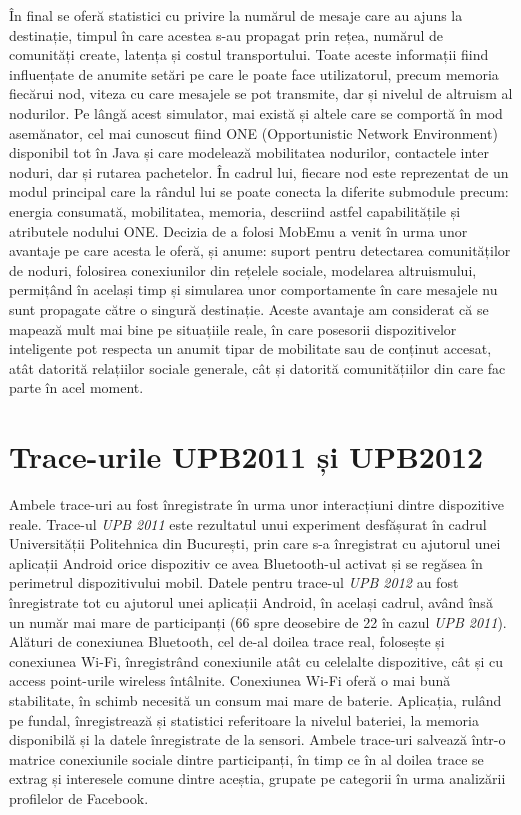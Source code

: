 \documentclass[12pt,a4paper]{report}
\begin{document}
În final se oferă statistici cu privire la numărul de mesaje care au ajuns la destinație, timpul în care acestea s-au propagat prin rețea, numărul de comunități create, latența și costul transportului. Toate aceste informații fiind influențate de anumite setări pe care le poate face utilizatorul, precum memoria fiecărui nod, viteza cu care mesajele se pot transmite, dar și nivelul de altruism al nodurilor.
Pe lângă acest simulator, mai există și altele care se comportă în mod asemănator, cel mai cunoscut fiind ONE (Opportunistic Network Environment)~\cite{OneArticle} disponibil tot în Java și care modelează mobilitatea nodurilor, contactele inter noduri, dar și rutarea pachetelor. În cadrul lui, fiecare nod este reprezentat de un modul principal care la rândul lui se poate conecta la diferite submodule precum: energia consumată, mobilitatea, memoria, descriind astfel capabilitățile și atributele nodului ONE. Decizia de a folosi MobEmu a venit în urma unor avantaje pe care acesta le oferă, și anume: suport pentru detectarea comunităților de noduri, folosirea conexiunilor din rețelele sociale, modelarea altruismului, permițând în același timp și simularea unor comportamente în care mesajele nu sunt propagate către o singură destinație. Aceste avantaje am considerat că se mapează mult mai bine pe situațiile reale, în care posesorii dispozitivelor inteligente pot respecta un anumit tipar de mobilitate sau de conținut accesat, atât datorită relațiilor sociale generale, cât și datorită comunitățiilor din care fac parte în acel moment.  
\fi

\section{Trace-urile UPB2011 și UPB2012} \label{trace-uri}
Ambele trace-uri au fost înregistrate în urma unor interacțiuni dintre dispozitive reale. Trace-ul \textit{UPB 2011} este rezultatul unui experiment desfășurat în cadrul Universității Politehnica din București, prin care s-a înregistrat cu ajutorul unei aplicații Android orice dispozitiv ce avea Bluetooth-ul activat și se regăsea în perimetrul dispozitivului mobil. Datele pentru trace-ul \textit{UPB 2012} au fost înregistrate tot cu ajutorul unei aplicații Android, în același cadrul, având însă un număr mai mare de participanți (66 spre deosebire de 22 în cazul \textit{UPB 2011}). Alături de conexiunea Bluetooth, cel de-al doilea trace real, folosește și conexiunea Wi-Fi, înregistrând conexiunile atât cu celelalte dispozitive, cât și cu access point-urile wireless întâlnite. Conexiunea Wi-Fi oferă o mai bună stabilitate, în schimb necesită un consum mai mare de baterie. Aplicația, rulând pe fundal, înregistrează și statistici referitoare la nivelul bateriei, la memoria disponibilă și la datele înregistrate de la sensori. Ambele trace-uri salvează într-o matrice conexiunile sociale dintre participanți, în timp ce în al doilea trace se extrag și interesele comune dintre aceștia, grupate pe categorii în urma analizării profilelor de Facebook.
\newpage
\end{document}
